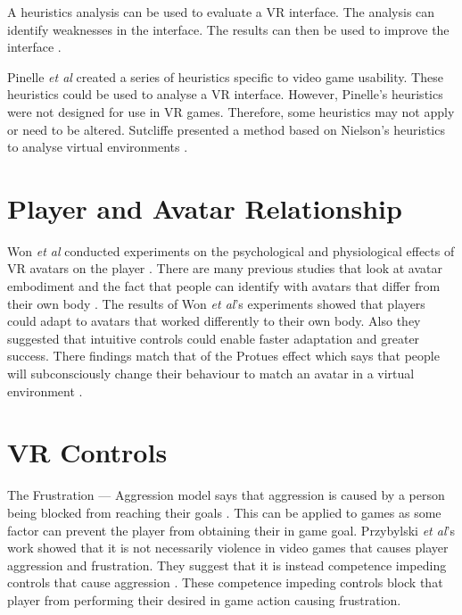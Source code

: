 \documentclass{scrartcl}
\begin{document}
\bigskip 
 
A heuristics analysis can be used to evaluate a VR interface.  The analysis can identify weaknesses in the interface. The results can then be used to improve the interface \cite{Nielsen, Pinelle}.


Pinelle \textit{et al} created a series of heuristics specific to video game usability. These heuristics could be used to analyse a VR interface. However, Pinelle's heuristics were not designed for use in VR games.  Therefore, some heuristics may not apply or need to be altered.  Sutcliffe presented a method based on Nielson's heuristics to analyse virtual environments \cite{sutcliffe2004heuristic}.

\section{Player and Avatar Relationship}

Won \textit{et al} conducted experiments on the psychological and physiological effects of  VR avatars on the player \cite{won2015homuncular}. 
There are many previous studies that look at avatar embodiment and the fact that people can identify with avatars that differ from their own body \cite{Groen, Latoschik}.
The results of Won \textit{et al}'s experiments showed that players could adapt to avatars that worked differently to their own body. Also they suggested that intuitive controls could enable faster adaptation and greater success. There findings match that of the Protues effect which says that people will subconsciously change their behaviour to match an avatar in a virtual environment \cite{won2015homuncular, yee2007proteus}.


\section{VR Controls}
The Frustration --- Aggression model says that aggression is caused by a person being blocked from reaching their goals \cite{dollard1939frustration}.  This can be applied to games as some factor can prevent the player from obtaining their in game goal.  Przybylski \textit{et al}'s work showed that it is not necessarily violence in video games that causes player aggression and frustration. They suggest that it is instead competence impeding controls that cause aggression \cite{przybylski, przybylski2010motivational}. These competence impeding controls block that player from performing their desired in game action causing frustration. 
\end{document}
